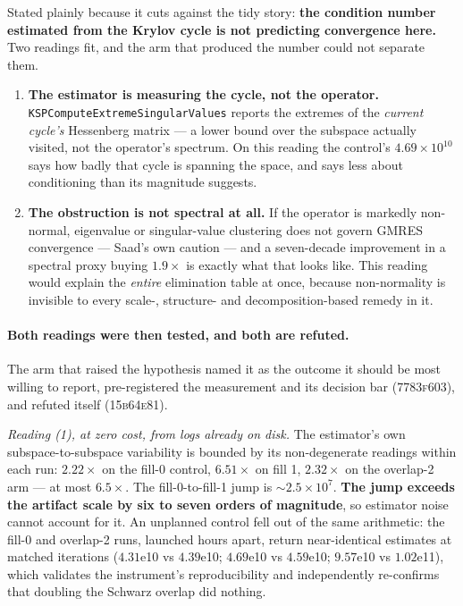 \documentclass[11pt,a4paper]{article}
\newcommand{\commit}[1]{\textsc{\small #1}}
\begin{document}
Stated plainly because it cuts against the tidy story: \textbf{the condition number estimated
from the Krylov cycle is not predicting convergence here.} Two readings fit, and the arm that
produced the number could not separate them.

\begin{enumerate}
\item \textbf{The estimator is measuring the cycle, not the operator.}
\texttt{KSPComputeExtremeSingularValues} reports the extremes of the \emph{current cycle's}
Hessenberg matrix --- a lower bound over the subspace actually visited, not the operator's
spectrum. On this reading the control's \(4.69\times10^{10}\) says how badly that cycle is
spanning the space, and says less about conditioning than its magnitude suggests.
\item \textbf{The obstruction is not spectral at all.} If the operator is markedly non-normal,
eigenvalue or singular-value clustering does not govern GMRES convergence --- Saad's own caution
--- and a seven-decade improvement in a spectral proxy buying \(1.9\times\) is exactly what that
looks like. This reading would explain the \emph{entire} elimination table at once, because
non-normality is invisible to every scale-, structure- and decomposition-based remedy in it.
\end{enumerate}

\paragraph{Both readings were then tested, and both are refuted.} The arm that raised the
hypothesis named it as the outcome it should be most willing to report, pre-registered the
measurement and its decision bar (\commit{7783f603}), and refuted itself (\commit{15b64e81}).

\emph{Reading (1), at zero cost, from logs already on disk.} The estimator's own
subspace-to-subspace variability is bounded by its non-degenerate readings within each run:
\(2.22\times\) on the fill-0 control, \(6.51\times\) on fill 1, \(2.32\times\) on the overlap-2
arm --- at most \(6.5\times\). The fill-0-to-fill-1 jump is \(\sim2.5\times10^{7}\).
\textbf{The jump exceeds the artifact scale by six to seven orders of magnitude}, so estimator
noise cannot account for it. An unplanned control fell out of the same arithmetic: the fill-0
and overlap-2 runs, launched hours apart, return near-identical estimates at matched iterations
(\(4.31\)e10 vs \(4.39\)e10; \(4.69\)e10 vs \(4.59\)e10; \(9.57\)e10 vs \(1.02\)e11), which
validates the instrument's reproducibility and independently re-confirms that doubling the
Schwarz overlap did nothing.
\end{document}

